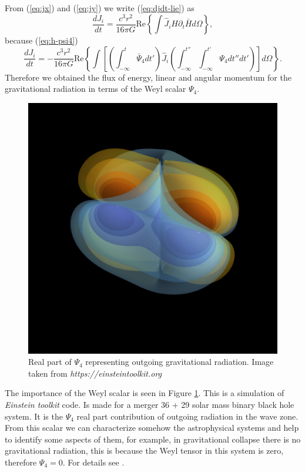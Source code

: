 From (\ref{eq:jx}) and (\ref{eq:jy}) we write (\ref{eq:djdt-lie})
as
\[
\frac{dJ_{i}}{dt}=\frac{c^{3}r^{2}}{16\pi G}\text{Re}\left\{ \int\hat{J}_{i}H\partial_{t}\bar{H}d\Omega\right\} ,
\]
because (\ref{eq:h-psi4})
\[
\frac{dJ_{i}}{dt}=-\frac{c^{3}r^{2}}{16\pi G}\text{Re}\left\{ \int\left[\left(\int_{-\infty}^{t}\bar{\Psi}_{4}dt'\right)\hat{J}_{i}\left(\int_{-\infty}^{t''}\int_{-\infty}^{t'}\Psi_{4}dt''dt'\right)\right]d\Omega\right\} .
\]
Therefore we obtained the flux of energy, linear and angular momentum
for the gravitational radiation in terms of the Weyl scalar $\Psi_{4}$.
\begin{figure}[h]
	\centering{}\includegraphics[scale=0.12]{Kap5/RePsi4.png}\caption{Real part of $\Psi_4$ representing outgoing gravitational radiation. Image taken from \textit{https://einsteintoolkit.org} \label{fig:psi4}}
\end{figure}
The importance of the Weyl scalar is seen in Figure \ref{fig:psi4}. This is a simulation of \textit{Einstein toolkit} code. Is made for a merger 36 + 29 solar mass binary black hole system. It is the $\Psi_4$ real part contribution of outgoing radiation in the wave zone. From this scalar we can characterize somehow the astrophysical systems and help to identify some aspects of them, for example, in gravitational collapse there is no gravitational radiation, this is because the Weyl tensor in this system is zero, therefore $\Psi_4=0$. For details see \cite{GRAVITATION}. 


